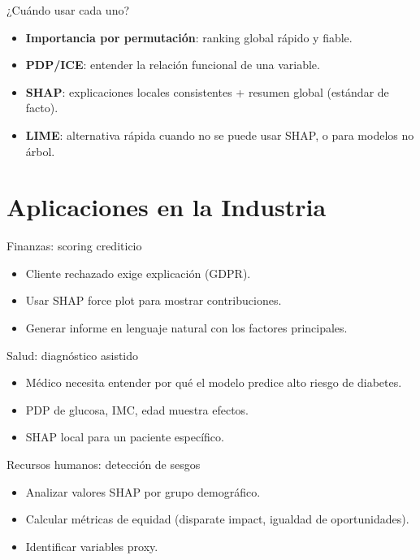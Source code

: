 \documentclass[aspectratio=169, 10pt, xcolor=table]{beamer}
\begin{document}
\begin{frame}{¿Cuándo usar cada uno?}
    \begin{itemize}
        \item \textbf{Importancia por permutación}: ranking global rápido y fiable.
        \item \textbf{PDP/ICE}: entender la relación funcional de una variable.
        \item \textbf{SHAP}: explicaciones locales consistentes + resumen global (estándar de facto).
        \item \textbf{LIME}: alternativa rápida cuando no se puede usar SHAP, o para modelos no árbol.
    \end{itemize}
\end{frame}

\section{Aplicaciones en la Industria}

\begin{frame}{Finanzas: scoring crediticio}
    \begin{itemize}
        \item Cliente rechazado exige explicación (GDPR).
        \item Usar SHAP force plot para mostrar contribuciones.
        \item Generar informe en lenguaje natural con los factores principales.
    \end{itemize}
\end{frame}

\begin{frame}{Salud: diagnóstico asistido}
    \begin{itemize}
        \item Médico necesita entender por qué el modelo predice alto riesgo de diabetes.
        \item PDP de glucosa, IMC, edad muestra efectos.
        \item SHAP local para un paciente específico.
    \end{itemize}
\end{frame}

\begin{frame}{Recursos humanos: detección de sesgos}
    \begin{itemize}
        \item Analizar valores SHAP por grupo demográfico.
        \item Calcular métricas de equidad (disparate impact, igualdad de oportunidades).
        \item Identificar variables proxy.
    \end{itemize}
\end{frame}
\end{document}
